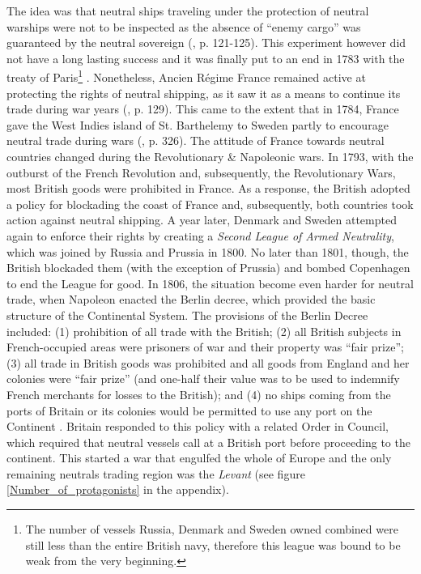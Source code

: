 \documentclass[12pt,a4paper,notitlepage,english]{article}
\begin{document}
The idea was that neutral ships traveling under the protection of neutral warships were not to be inspected as the absence of ``enemy cargo'' was guaranteed by the neutral sovereign (\cite{Schnakenbourg2013}, p. 121-125).
This experiment however did not have a long lasting success and it was finally put to an end in 1783 with the treaty of Paris\footnote{The number of vessels Russia, Denmark and Sweden owned combined were still less than the entire British navy, therefore this league was bound to be weak from the very beginning.} \citep{Griffiths1971}.
Nonetheless, Ancien Régime France remained active at protecting the rights of neutral shipping, as it saw it as a means to continue its trade during war years (\cite{Schnakenbourg2013}, p. 129). This came to the extent that in 1784, France gave the West Indies island of St. Barthelemy to Sweden partly to encourage neutral trade during wars (\cite{Schnakenbourg2013}, p. 326).
The attitude of France towards neutral countries changed during the Revolutionary \& Napoleonic wars. In 1793, with the outburst of the French Revolution and, subsequently, the Revolutionary Wars, most British goods were prohibited in France.
As a response, the British adopted a policy for blockading the coast of France and, subsequently, both countries took action against neutral shipping.
A year later, Denmark and Sweden attempted again to enforce their rights by creating a \textit{Second League of Armed Neutrality}, which was joined by Russia and Prussia in 1800.
No later than 1801, though, the British blockaded them (with the exception of Prussia) and bombed Copenhagen to end the League for good.
In 1806, the situation become even harder for neutral trade, when Napoleon enacted the Berlin decree, which provided the basic structure of the Continental System.
The provisions of the Berlin Decree included: (1) prohibition of all trade with the British; (2) all British subjects in French-occupied areas were prisoners of war and their property was ``fair prize''; (3) all trade in British goods was prohibited and all goods from England and her colonies were ``fair prize'' (and one-half their value was to be used to indemnify French merchants for losses to the British); and (4) no ships coming from the ports of Britain or its colonies would be permitted to use any port on the Continent \citep{Davis2006}.
Britain responded to this policy with a related Order in Council, which required that neutral vessels call at a British port before proceeding to the continent. This started a war that engulfed the whole of Europe and the only remaining neutrals trading region was the \textit{Levant} (see figure \ref{Number_of_protagonists} in the appendix). 
\end{document}
